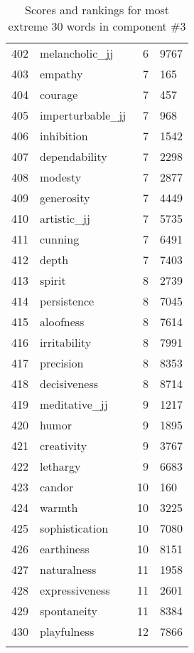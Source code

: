 \begin{longtable}[!htbp]{| rlr@{.}l |}
    402 & melancholic\_jj & 6 & 9767 \\
    403 & empathy & 7 & 165 \\
    404 & courage & 7 & 457 \\
    405 & imperturbable\_jj & 7 & 968 \\
    406 & inhibition & 7 & 1542 \\
    407 & dependability & 7 & 2298 \\
    408 & modesty & 7 & 2877 \\
    409 & generosity & 7 & 4449 \\
    410 & artistic\_jj & 7 & 5735 \\
    411 & cunning & 7 & 6491 \\
    412 & depth & 7 & 7403 \\
    413 & spirit & 8 & 2739 \\
    414 & persistence & 8 & 7045 \\
    415 & aloofness & 8 & 7614 \\
    416 & irritability & 8 & 7991 \\
    417 & precision & 8 & 8353 \\
    418 & decisiveness & 8 & 8714 \\
    419 & meditative\_jj & 9 & 1217 \\
    420 & humor & 9 & 1895 \\
    421 & creativity & 9 & 3767 \\
    422 & lethargy & 9 & 6683 \\
    423 & candor & 10 & 160 \\
    424 & warmth & 10 & 3225 \\
    425 & sophistication & 10 & 7080 \\
    426 & earthiness & 10 & 8151 \\
    427 & naturalness & 11 & 1958 \\
    428 & expressiveness & 11 & 2601 \\
    429 & spontaneity & 11 & 8384 \\
    430 & playfulness & 12 & 7866 \\
    \hline
    \caption{Scores and rankings for most extreme 30 words in component \#3} \\
\end{longtable}
